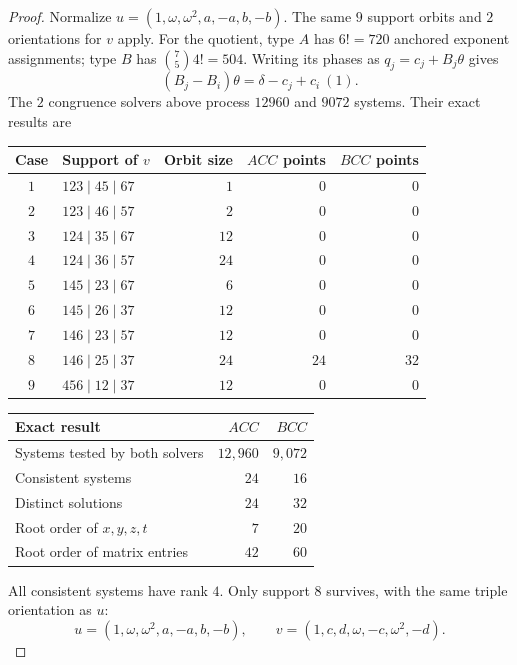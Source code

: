 \documentclass[11pt,a4paper]{article}
\theoremstyle{plain}
\theoremstyle{definition}
\numberwithin{equation}{section}
\begin{document}
\begin{proof}\label{mixed:s:supports}\label{mixed:s:solving}
Normalize $u=(1,\omega,\omega^2,a,-a,b,-b)$. The same $9$ support orbits and $2$ orientations for $v$ apply. For the quotient, type $A$ has $6!=720$ anchored exponent assignments; type $B$ has $\binom75 4!=504$. Writing its phases as $q_j=c_j+B_j\theta$ gives
\begin{equation}
 (B_j-B_i)\theta=\delta-c_j+c_i\ (1). \label{mixed:eq5}
\end{equation}
The $2$ congruence solvers above process $12960$ and $9072$ systems. Their exact results are
\begin{center}\begin{tabular}{@{}clrrr@{}}\toprule
Case & Support of \(v\) & Orbit size & \(ACC\) points & \(BCC\) points\\\midrule
$1$&\(123\mid45\mid67\)&$1$&$0$&$0$\\
$2$&\(123\mid46\mid57\)&$2$&$0$&$0$\\
$3$&\(124\mid35\mid67\)&$12$&$0$&$0$\\
$4$&\(124\mid36\mid57\)&$24$&$0$&$0$\\
$5$&\(145\mid23\mid67\)&$6$&$0$&$0$\\
$6$&\(145\mid26\mid37\)&$12$&$0$&$0$\\
$7$&\(146\mid23\mid57\)&$12$&$0$&$0$\\
$8$&\(146\mid25\mid37\)&$24$&$24$&$32$\\
$9$&\(456\mid12\mid37\)&$12$&$0$&$0$\\\bottomrule
\end{tabular}\end{center}
\begin{center}\begin{tabular}{@{}lrr@{}}\toprule
Exact result & \(ACC\)&\(BCC\)\\\midrule
Systems tested by both solvers &$12{,}960$&$9{,}072$\\
Consistent systems &$24$&$16$\\
Distinct solutions &$24$&$32$\\
Root order of \(x,y,z,t\) &$7$&$20$\\
Root order of matrix entries &$42$&$60$\\\bottomrule
\end{tabular}\end{center}
All consistent systems have rank $4$. Only support $8$ survives, with the same triple orientation as $u$:
$$
 u=(1,\omega,\omega^2,a,-a,b,-b),\qquad
 v=(1,c,d,\omega,-c,\omega^2,-d).
$$
\end{proof}
\end{document}
